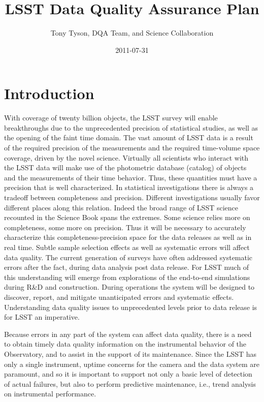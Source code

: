 \documentclass[SE,toc,lsstdraft]{lsstdoc}
\title{LSST Data Quality Assurance Plan}
\author{Tony Tyson, DQA Team, and Science Collaboration}
\date{2011-07-31}
\begin{document}
\maketitle

\section{Introduction}

With coverage of twenty billion objects, the LSST survey will enable breakthroughs due to the unprecedented precision of statistical studies, as well as the opening of the faint time domain. The vast amount of LSST data is a result of the required precision of the measurements and the required time-volume space coverage, driven by the novel science. Virtually all scientists who interact with the LSST data will make use of the photometric database (catalog) of objects and the measurements of their time behavior. Thus, these quantities must have a precision that is well characterized.  In statistical investigations there is always a tradeoff between completeness and precision. Different investigations usually favor different places along this relation.  Indeed the broad range of LSST science recounted in the Science Book spans the extremes. Some science relies more on completeness, some more on precision. Thus it will be necessary to accurately characterize this completeness-precision space for the data releases as well as in real time. Subtle sample selection effects as well as systematic errors will affect data quality. The current generation of surveys have often addressed systematic errors after the fact, during data analysis post data release. For LSST much of this understanding will emerge from explorations of the end-to-end simulations during R\&D and construction.  During operations the system will be designed to discover, report, and mitigate unanticipated errors and systematic effects.  Understanding data quality issues to unprecedented levels prior to data release is for LSST an imperative.

Because errors in any part of the system can affect data quality, there is a need to obtain timely data quality information on the instrumental behavior of the Observatory, and to assist in the support of its maintenance. Since the LSST has only a single instrument, uptime concerns for the camera and the data system are paramount, and so it is important to support not only a basic level of detection of actual failures, but also to perform predictive maintenance, i.e., trend analysis on instrumental performance.
\end{document}
